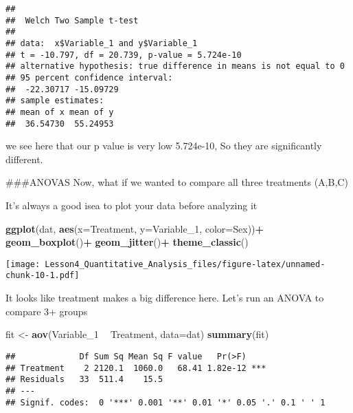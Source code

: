 \documentclass[
]{article}
\newenvironment{Shaded}{\begin{snugshade}}{\end{snugshade}}
\newcommand{\DataTypeTok}[1]{\textcolor[rgb]{0.13,0.29,0.53}{#1}}
\newcommand{\DecValTok}[1]{\textcolor[rgb]{0.00,0.00,0.81}{#1}}
\newcommand{\KeywordTok}[1]{\textcolor[rgb]{0.13,0.29,0.53}{\textbf{#1}}}
\newcommand{\NormalTok}[1]{#1}
\newcommand{\OperatorTok}[1]{\textcolor[rgb]{0.81,0.36,0.00}{\textbf{#1}}}
\newcommand{\StringTok}[1]{\textcolor[rgb]{0.31,0.60,0.02}{#1}}
\begin{document}
\begin{verbatim}
## 
##  Welch Two Sample t-test
## 
## data:  x$Variable_1 and y$Variable_1
## t = -10.797, df = 20.739, p-value = 5.724e-10
## alternative hypothesis: true difference in means is not equal to 0
## 95 percent confidence interval:
##  -22.30717 -15.09729
## sample estimates:
## mean of x mean of y 
##  36.54730  55.24953
\end{verbatim}

we see here that our p value is very low 5.724e-10, So they are
significantly different.

\#\#\#ANOVAS Now, what if we wanted to compare all three treatments
(A,B,C)

It's always a good isea to plot your data before analyzing it

\begin{Shaded}
\begin{Highlighting}[]
\KeywordTok{ggplot}\NormalTok{(dat, }\KeywordTok{aes}\NormalTok{(}\DataTypeTok{x=}\NormalTok{Treatment, }\DataTypeTok{y=}\NormalTok{Variable_}\DecValTok{1}\NormalTok{, }\DataTypeTok{color=}\NormalTok{Sex))}\OperatorTok{+}
\StringTok{  }\KeywordTok{geom_boxplot}\NormalTok{()}\OperatorTok{+}
\StringTok{  }\KeywordTok{geom_jitter}\NormalTok{()}\OperatorTok{+}
\StringTok{  }\KeywordTok{theme_classic}\NormalTok{()}
\end{Highlighting}
\end{Shaded}

\texttt{[image: Lesson4\_Quantitative\_Analysis\_files/figure-latex/unnamed-chunk-10-1.pdf]}

It looks like treatment makes a big difference here. Let's run an ANOVA
to compare 3+ groups

\begin{Shaded}
\begin{Highlighting}[]
\NormalTok{fit <-}\StringTok{ }\KeywordTok{aov}\NormalTok{(Variable_}\DecValTok{1} \OperatorTok{~}\StringTok{ }\NormalTok{Treatment, }\DataTypeTok{data=}\NormalTok{dat)}
\KeywordTok{summary}\NormalTok{(fit)}
\end{Highlighting}
\end{Shaded}

\begin{verbatim}
##             Df Sum Sq Mean Sq F value   Pr(>F)    
## Treatment    2 2120.1  1060.0   68.41 1.82e-12 ***
## Residuals   33  511.4    15.5                     
## ---
## Signif. codes:  0 '***' 0.001 '**' 0.01 '*' 0.05 '.' 0.1 ' ' 1
\end{verbatim}
\end{document}
